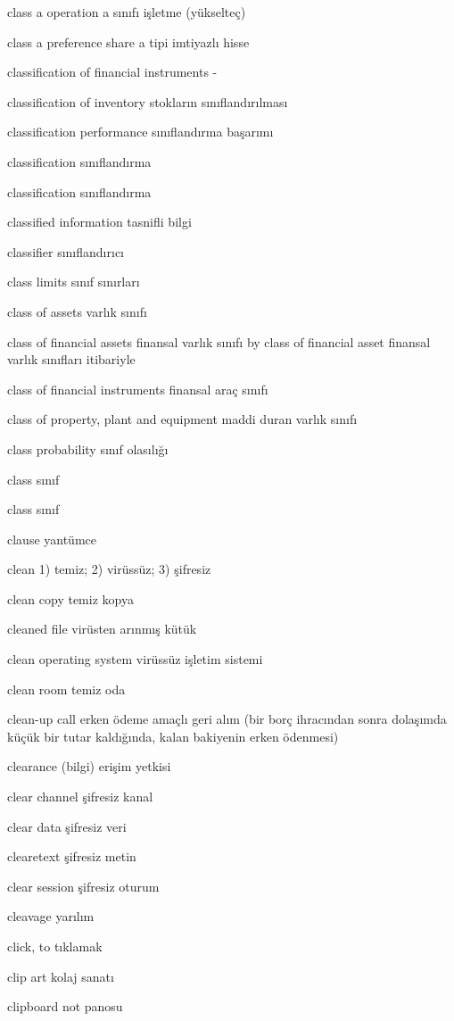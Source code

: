 \documentclass[12pt,fleqn]{article}\usepackage{../../common}
\begin{document}
class a operation a sınıfı işletme (yükselteç)

class a preference share a tipi imtiyazlı hisse

classification of financial instruments -

classification of inventory stokların sınıflandırılması

classification performance sınıflandırma başarımı

classification sınıflandırma

classification sınıflandırma

classified information tasnifli bilgi

classifier sınıflandırıcı

class limits sınıf sınırları

class of assets varlık sınıfı

class of financial assets finansal varlık sınıfı by class of financial asset finansal varlık sınıfları itibariyle

class of financial instruments finansal araç sınıfı

class of property, plant and equipment maddi duran varlık sınıfı

class probability sınıf olasılığı

class sınıf

class sınıf

clause yantümce

clean 1) temiz; 2) virüssüz; 3) şifresiz

clean copy temiz kopya

cleaned file virüsten arınmış kütük

clean operating system virüssüz işletim sistemi

clean room temiz oda

clean-up call erken ödeme amaçlı geri alım (bir borç ihracından sonra dolaşımda küçük bir tutar kaldığında, kalan bakiyenin erken ödenmesi)

clearance (bilgi) erişim yetkisi

clear channel şifresiz kanal

clear data şifresiz veri

clearetext şifresiz metin

clear session şifresiz oturum

cleavage yarılım

click, to tıklamak

clip art kolaj sanatı

clipboard not panosu
\end{document}
